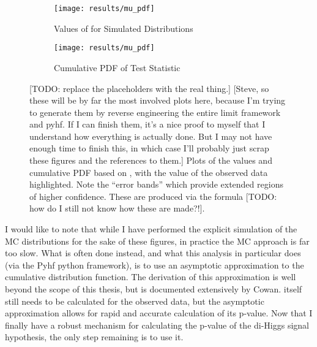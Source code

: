     \begin{figure}
        \centering
        \begin{subfigure}{0.48\textwidth} 
            \texttt{[image: results/mu\_pdf]}
            \caption{Values of \qtil for Simulated Distributions}
            \label{fig:qtil:pdf}
        \end{subfigure}
        \begin{subfigure}{0.48\textwidth}
            \texttt{[image: results/mu\_pdf]}
            \caption{Cumulative PDF of \qtil Test Statistic}
            \label{fig:qtil:Cpdf}
        \end{subfigure}
        \caption{
            [TODO: replace the placeholders with the real thing.]
            [Steve, so these will be by far the most involved plots here,
                because I'm trying to generate them by reverse engineering the entire limit framework and pyhf.
            If I can finish them, it's a nice proof to myself that I understand how everything is actually done.
            But I may not have enough time to finish this,
                in which case I'll probably just scrap these figures and the references to them.]
            Plots of the values and cumulative PDF based on \qtil,
                with the \qtil value of the observed data highlighted.
            Note the ``error bands'' which provide extended regions of higher confidence.
            These are produced via the formula [TODO: how do I still not know how these are made?!].
        }
    \end{figure}

    I would like to note that while I have performed the explicit simulation of the MC distributions for the sake of these figures,
        in practice the MC approach is far too slow.
    What is often done instead, and what this analysis in particular does (via the Pyhf python framework),
        is to use an asymptotic approximation to the \qtil cumulative distribution function.
    The derivation of this approximation is well beyond the scope of this thesis,
        but is documented extensively by Cowan\cite{asymptotic_formulae_for_likelihood}.
    \qtil itself still needs to be calculated for the observed data,
        but the asymptotic approximation allows for rapid and accurate calculation of its p-value.
    Now that I finally have a robust mechanism for calculating the p-value of the di-Higgs signal hypothesis,
        the only step remaining is to use it.

